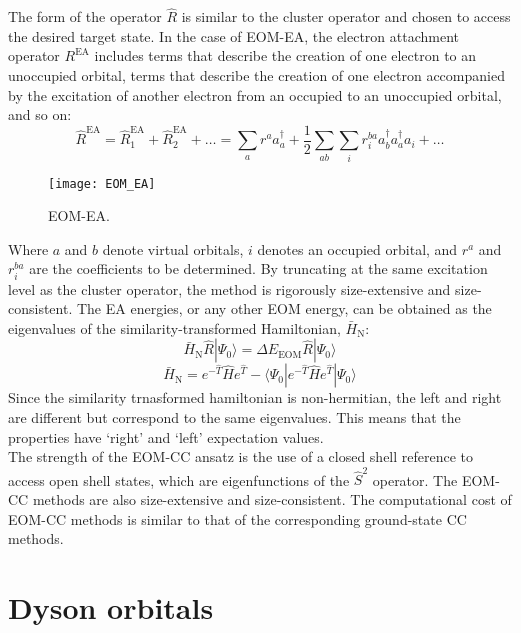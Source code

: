 The form of the operator $\hat{R}$ is similar to the cluster operator and chosen to access the desired target state. In the case of EOM-EA, the electron attachment operator $R^{\text{EA}}$ includes terms that describe the creation of one electron to an unoccupied orbital, terms that describe the creation of one electron accompanied by the excitation of another electron from an occupied to an unoccupied orbital, and so on:
\begin{equation}\label{eq:R_EA}
    \hat{R}^{\mathrm{EA}} = \hat{R}_1^{\mathrm{EA}} + \hat{R}_2^{\mathrm{EA}} + \ldots = \sum_{a} r^a a_a^{\dagger} + \frac{1}{2}\sum_{ab} \sum_{i} r^{ba}_{i} a_b^{\dagger} a_a^{\dagger} a_i + \ldots
\end{equation}
\begin{figure}
    \centering
    \medskip
    \texttt{[image: EOM\_EA]}
    \caption{EOM-EA.}
    \label{fig:EOM}
  \end{figure}
  Where $a$ and $b$ denote virtual orbitals, $i$ denotes an occupied orbital, and $r^a$ and $r^{ba}_{i}$ are the coefficients to be determined. By truncating at the same excitation level as the cluster operator, the method is rigorously size-extensive and size-consistent. The EA energies, or any other EOM energy, can be obtained as the eigenvalues of the similarity-transformed Hamiltonian, $\bar{H}_{\mathrm{N}}$:
\begin{equation}
    \bar{H}_{\mathrm{N}} \hat{R} | \Psi_0 \rangle = \Delta E_{\mathrm{EOM}} \hat{R} | \Psi_0 \rangle
\end{equation}
\begin{equation}
    \bar{H}_{\mathrm{N}} = e^{-\hat{T}} \hat{H} e^{\hat{T}} - \langle \Psi_0 | e^{-\hat{T}} \hat{H} e^{\hat{T}} | \Psi_0 \rangle
\end{equation}
Since the similarity trnasformed hamiltonian is non-hermitian, the left and right are different but correspond to the same eigenvalues. This means that the properties have `right' and `left' expectation values. \\
The strength of the EOM-CC ansatz is the use of a closed shell reference to access open shell states, which are eigenfunctions of the $\hat{S}^2$ operator. The EOM-CC methods are also size-extensive and size-consistent. The computational cost of EOM-CC methods is similar to that of the corresponding ground-state CC methods.

\section{Dyson orbitals}

